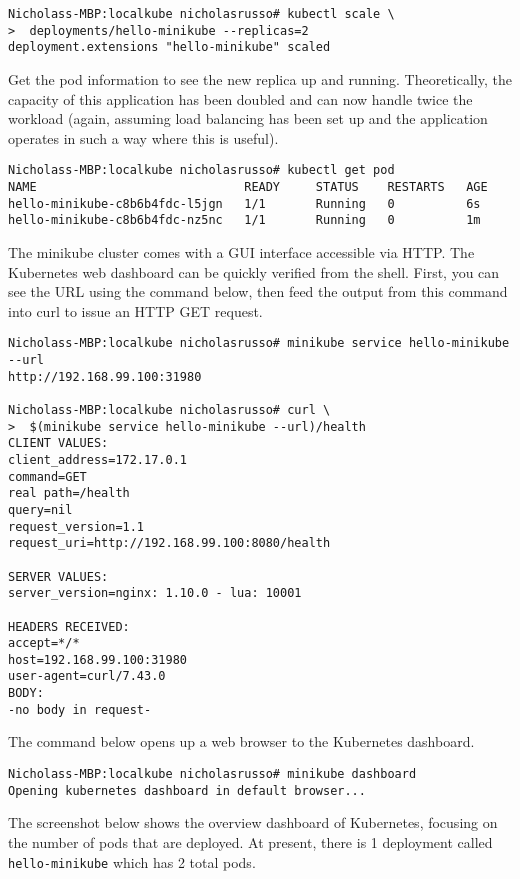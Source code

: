 \begin{verbatim}
Nicholass-MBP:localkube nicholasrusso# kubectl scale \
>  deployments/hello-minikube --replicas=2
deployment.extensions "hello-minikube" scaled
\end{verbatim}

Get the pod information to see the new replica up and running. Theoretically,
the capacity of this application has been doubled and can now handle twice the
workload (again, assuming load balancing has been set up and the application
operates in such a way where this is useful).

\begin{verbatim}
Nicholass-MBP:localkube nicholasrusso# kubectl get pod
NAME                             READY     STATUS    RESTARTS   AGE
hello-minikube-c8b6b4fdc-l5jgn   1/1       Running   0          6s
hello-minikube-c8b6b4fdc-nz5nc   1/1       Running   0          1m
\end{verbatim}

The minikube cluster comes with a GUI interface accessible via HTTP\@. The
Kubernetes web dashboard can be quickly verified from the shell. First, you
can see the URL using the command below, then feed the output from this
command into curl to issue an HTTP GET request.

\begin{verbatim}
Nicholass-MBP:localkube nicholasrusso# minikube service hello-minikube --url
http://192.168.99.100:31980

Nicholass-MBP:localkube nicholasrusso# curl \
>  $(minikube service hello-minikube --url)/health
CLIENT VALUES:
client_address=172.17.0.1
command=GET
real path=/health
query=nil
request_version=1.1
request_uri=http://192.168.99.100:8080/health

SERVER VALUES:
server_version=nginx: 1.10.0 - lua: 10001

HEADERS RECEIVED:
accept=*/*
host=192.168.99.100:31980
user-agent=curl/7.43.0
BODY:
-no body in request-
\end{verbatim}

The command below opens up a web browser to the Kubernetes dashboard.

\begin{verbatim}
Nicholass-MBP:localkube nicholasrusso# minikube dashboard
Opening kubernetes dashboard in default browser...
\end{verbatim}

The screenshot below shows the overview dashboard of Kubernetes, focusing on
the number of pods that are deployed. At present, there is 1 deployment called
\verb|hello-minikube| which has 2 total pods.

